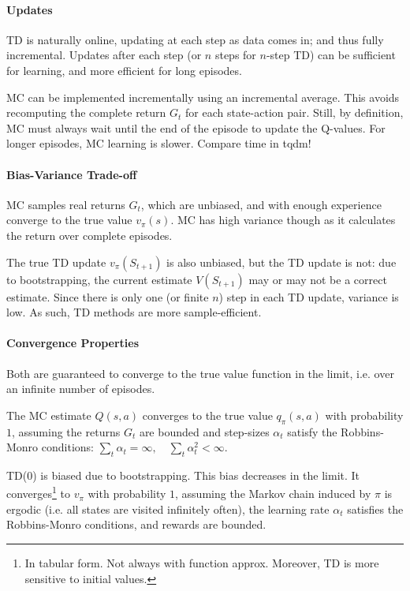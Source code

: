 \documentclass[12pt]{article}
\begin{document}
\paragraph{Updates}

TD is naturally online, updating at each step as data comes in; and thus fully incremental.
Updates after each step (or $n$ steps for $n$-step TD) can be sufficient for learning,
and more efficient for long episodes.

MC can be implemented incrementally using an incremental average.
This avoids recomputing the complete return $G_t$ for each state-action pair.
Still, by definition, MC must always wait until the end of the episode to update the Q-values.
For longer episodes, MC learning is slower. Compare time in tqdm!

\paragraph{Bias-Variance Trade-off}

MC samples real returns $G_t$, which are unbiased, and with enough experience converge to the true value $v_\pi(s)$.
MC has high variance though as it calculates the return over complete episodes.

The true TD update $v_\pi(S_{t+1})$ is also unbiased, but the TD update is not:
due to bootstrapping, the current estimate $V(S_{t+1})$ may or may not be a correct estimate.
Since there is only one (or finite $n$) step in each TD update, variance is low.
As such, TD methods are more sample-efficient.

\paragraph{Convergence Properties}

Both are guaranteed to converge to the true value function in the limit, i.e. over an infinite number of episodes.

The MC estimate $Q(s, a)$ converges to the true value $q_\pi(s, a)$ with probability $1$,
assuming the returns $G_t$ are bounded and step-sizes $\alpha_t$ satisfy the Robbins-Monro conditions:
$\sum_{t} \alpha_t = \infty, \quad \sum_{t} \alpha_t^2 < \infty$.

TD(0) is biased due to bootstrapping. This bias decreases in the limit.
It converges\footnote{In tabular form. Not always with function approx. Moreover, TD is more sensitive to initial values.} to $v_\pi$ with probability $1$, assuming
the Markov chain induced by $\pi$ is ergodic (i.e. all states are visited infinitely often),
the learning rate $\alpha_t$ satisfies the Robbins-Monro conditions,
and rewards are bounded.
\end{document}
